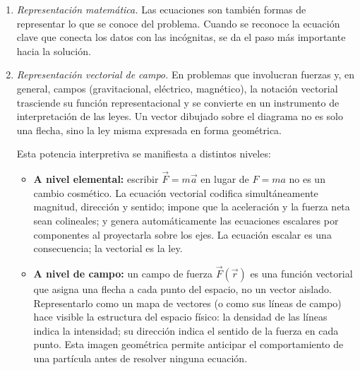 \documentclass[11pt]{book}
\begin{document}
\begin{enumerate}
\begin{enumerate}
    \item {\it Representación matemática.} Las ecuaciones son también formas de representar lo que se conoce del problema. Cuando se reconoce la ecuación clave que conecta los datos con las incógnitas, se da el paso más importante hacia la solución.

    \item {\it Representación vectorial de campo.} En problemas que involucran fuerzas y, en general, campos (gravitacional, eléctrico, magnético), la notación vectorial trasciende su función representacional y se convierte en un instrumento de interpretación de las leyes. Un vector dibujado sobre el diagrama no es solo una flecha, sino la ley misma expresada en forma geométrica.

    Esta potencia interpretiva se manifiesta a distintos niveles:
    \begin{itemize}
        \item {\bf A nivel elemental:} escribir $\vec{F} = m\vec{a}$ en lugar de $F = ma$ no es un cambio cosmético. La ecuación vectorial codifica simultáneamente magnitud, dirección y sentido; impone que la aceleración y la fuerza neta sean colineales; y genera automáticamente las ecuaciones escalares por componentes al proyectarla sobre los ejes. La ecuación escalar es una consecuencia; la vectorial es la ley.

        \item {\bf A nivel de campo:} un campo de fuerza $\vec{F}(\vec{r})$ es una función vectorial que asigna una flecha a cada punto del espacio, no un vector aislado. Representarlo como un mapa de vectores (o como sus líneas de campo) hace visible la estructura del espacio físico: la densidad de las líneas indica la intensidad; su dirección indica el sentido de la fuerza en cada punto. Esta imagen geométrica permite anticipar el comportamiento de una partícula antes de resolver ninguna ecuación.


\end{itemize}
\end{enumerate}
\end{enumerate}
\end{document}
